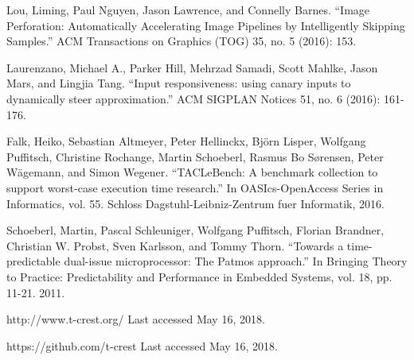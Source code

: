 \begin{thebibliography}{}
  Lou, Liming, Paul Nguyen, Jason Lawrence, and Connelly Barnes. ``Image Perforation: Automatically Accelerating Image Pipelines by Intelligently Skipping Samples.'' ACM Transactions on Graphics (TOG) 35, no. 5 (2016): 153.

  Laurenzano, Michael A., Parker Hill, Mehrzad Samadi, Scott Mahlke, Jason Mars, and Lingjia Tang. ``Input responsiveness: using canary inputs to dynamically steer approximation.'' ACM SIGPLAN Notices 51, no. 6 (2016): 161-176.

  Falk, Heiko, Sebastian Altmeyer, Peter Hellinckx, Björn Lisper, Wolfgang Puffitsch, Christine Rochange, Martin Schoeberl, Rasmus Bo Sørensen, Peter Wägemann, and Simon Wegener. ``TACLeBench: A benchmark collection to support worst-case execution time research.'' In OASIcs-OpenAccess Series in Informatics, vol. 55. Schloss Dagstuhl-Leibniz-Zentrum fuer Informatik, 2016.
  
  Schoeberl, Martin, Pascal Schleuniger, Wolfgang Puffitsch, Florian Brandner, Christian W. Probst, Sven Karlsson, and Tommy Thorn. ``Towards a time-predictable dual-issue microprocessor: The Patmos approach.'' In Bringing Theory to Practice: Predictability and Performance in Embedded Systems, vol. 18, pp. 11-21. 2011.

  http://www.t-crest.org/
  Last accessed May 16, 2018.

  https://github.com/t-crest
  Last accessed May 16, 2018.
  
\end{thebibliography}
